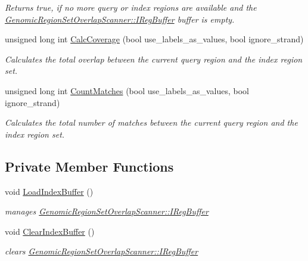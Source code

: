 \begin{CompactItemize}
\begin{CompactList}\small\item\em Returns true, if no more query or index regions are available and the \hyperlink{classGenomicRegionSetOverlapScanner_5cef1f4f621533d6ce6a47fc106f35cd}{GenomicRegionSetOverlapScanner::IRegBuffer} buffer is empty. \item\end{CompactList}\item 
unsigned long int \hyperlink{classGenomicRegionSetOverlapScanner_2b51a7827283cf09ce9d0a822714d738}{CalcCoverage} (bool use\_\-labels\_\-as\_\-values, bool ignore\_\-strand)
\begin{CompactList}\small\item\em Calculates the total overlap between the current query region and the index region set. \item\end{CompactList}\item 
unsigned long int \hyperlink{classGenomicRegionSetOverlapScanner_7826504ecdb81cf0828b428078ec1844}{CountMatches} (bool use\_\-labels\_\-as\_\-values, bool ignore\_\-strand)
\begin{CompactList}\small\item\em Calculates the total number of matches between the current query region and the index region set. \item\end{CompactList}\end{CompactItemize}
\subsection*{Private Member Functions}
\begin{CompactItemize}
\item 
\hypertarget{classGenomicRegionSetOverlapScanner_2241b4411418e51f21dfbbff56332940}{
void \hyperlink{classGenomicRegionSetOverlapScanner_2241b4411418e51f21dfbbff56332940}{LoadIndexBuffer} ()}
\label{classGenomicRegionSetOverlapScanner_2241b4411418e51f21dfbbff56332940}

\begin{CompactList}\small\item\em manages \hyperlink{classGenomicRegionSetOverlapScanner_5cef1f4f621533d6ce6a47fc106f35cd}{GenomicRegionSetOverlapScanner::IRegBuffer} \item\end{CompactList}\item 
\hypertarget{classGenomicRegionSetOverlapScanner_4c877e18eeeb397c5c2de2bca6ce0ff0}{
void \hyperlink{classGenomicRegionSetOverlapScanner_4c877e18eeeb397c5c2de2bca6ce0ff0}{ClearIndexBuffer} ()}
\label{classGenomicRegionSetOverlapScanner_4c877e18eeeb397c5c2de2bca6ce0ff0}

\begin{CompactList}\small\item\em clears \hyperlink{classGenomicRegionSetOverlapScanner_5cef1f4f621533d6ce6a47fc106f35cd}{GenomicRegionSetOverlapScanner::IRegBuffer} \item\end{CompactList}\end{CompactItemize}
